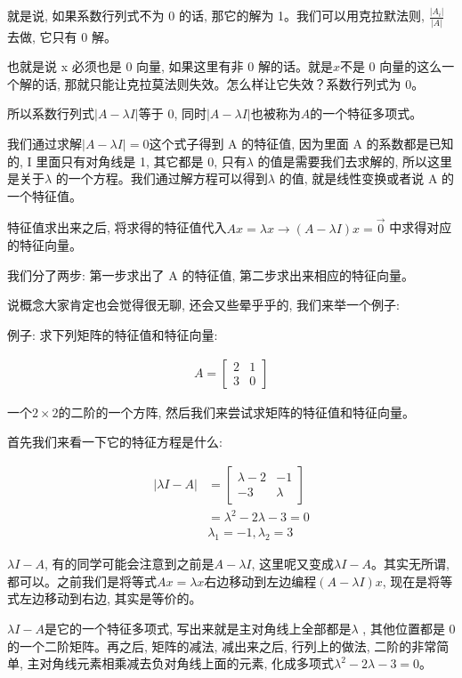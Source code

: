 就是说, 如果系数行列式不为 0 的话, 那它的解为 1。我们可以用克拉默法则, $\frac{|A_i|}{|A|}$去做, 它只有 0 解。

也就是说 x 必须也是 0 向量, 如果这里有非 0 解的话。就是$x$不是 0 向量的这么一个解的话, 那就只能让克拉莫法则失效。怎么样让它失效？系数行列式为 0。

所以系数行列式$|A - \lambda I|$等于 0, 同时$|A - \lambda I|$也被称为$A$的一个特征多项式。

我们通过求解$|A - \lambda I|=0$这个式子得到 A 的特征值, 因为里面 A 的系数都是已知的, I 里面只有对角线是 1, 其它都是 0, 只有$\lambda$ 的值是需要我们去求解的, 所以这里是关于$\lambda$ 的一个方程。我们通过解方程可以得到$\lambda$ 的值, 就是线性变换或者说 A 的一个特征值。

特征值求出来之后, 将求得的特征值代入$Ax = \lambda x \to (A - \lambda I)x = \vec 0$ 中求得对应的特征向量。

我们分了两步: 第一步求出了 A 的特征值, 第二步求出来相应的特征向量。

说概念大家肯定也会觉得很无聊, 还会又些晕乎乎的, 我们来举一个例子: 

例子: 求下列矩阵的特征值和特征向量: 

\begin{align*}
  A = \begin{bmatrix}2 & 1 \\ 3 & 0 \end{bmatrix}
\end{align*}

一个$2 \times 2$的二阶的一个方阵, 然后我们来尝试求矩阵的特征值和特征向量。

首先我们来看一下它的特征方程是什么: 

\begin{align*}
  |\lambda I-A| & = \begin{bmatrix} \lambda -2 & -1 \\ -3 & \lambda  \end{bmatrix} \\
  & = \lambda ^2 - 2\lambda  -3 = 0 \\
  & \lambda _1 = -1, \lambda _2 = 3
\end{align*}

$\lambda I-A$, 有的同学可能会注意到之前是$A-\lambda I$, 这里呢又变成$\lambda I-A$。其实无所谓, 都可以。之前我们是将等式$Ax = \lambda x$右边移动到左边编程$(A - \lambda I)x$, 现在是将等式左边移动到右边, 其实是等价的。

$\lambda I-A$是它的一个特征多项式, 写出来就是主对角线上全部都是$\lambda$ , 其他位置都是 0 的一个二阶矩阵。再之后, 矩阵的减法, 减出来之后, 行列上的做法, 二阶的非常简单, 主对角线元素相乘减去负对角线上面的元素, 化成多项式$\lambda ^2 - 2\lambda  -3 = 0$。

